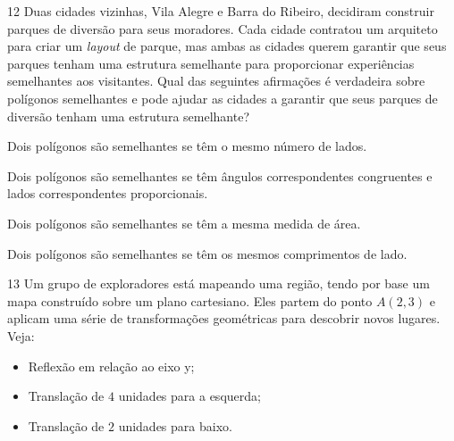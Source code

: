 \num{12} Duas cidades vizinhas, Vila Alegre e Barra do Ribeiro, decidiram
construir parques de diversão para seus moradores. Cada cidade contratou
um arquiteto para criar um \textit{layout} de parque, mas ambas as cidades
querem garantir que seus parques tenham uma estrutura semelhante para proporcionar
experiências semelhantes aos visitantes. Qual das seguintes afirmações é verdadeira
sobre polígonos semelhantes e pode ajudar as cidades a garantir que seus parques
de diversão tenham uma estrutura semelhante?

\begin{escolha}
\item Dois polígonos são semelhantes se têm o mesmo número de lados.

\item Dois polígonos são semelhantes se têm ângulos correspondentes congruentes e lados correspondentes proporcionais.

\item Dois polígonos são semelhantes se têm a mesma medida de área.

\item Dois polígonos são semelhantes se têm os mesmos comprimentos de lado.
\end{escolha}



\num{13} Um grupo de exploradores está mapeando uma região, tendo por base
um mapa construído sobre um plano cartesiano. Eles partem do ponto $A(2,3)$
e aplicam uma série de transformações geométricas para descobrir novos lugares.
Veja:

\begin{itemize}
\item Reflexão em relação ao eixo y;
\item Translação de $4$ unidades para a esquerda;
\item Translação de $2$ unidades para baixo.
\end{itemize}

